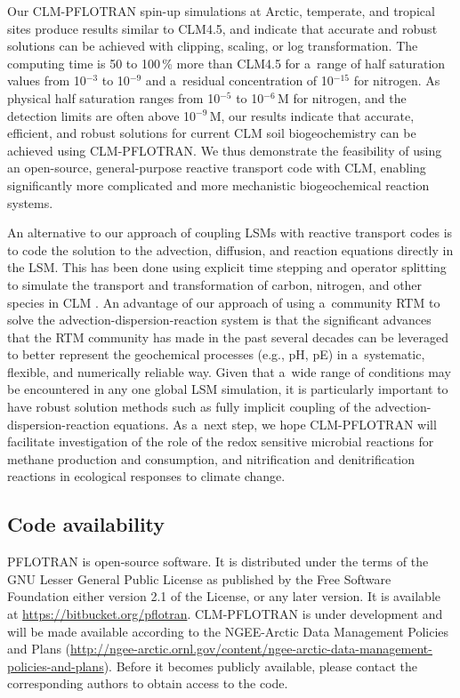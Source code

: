 \documentclass[gmdd, online, hvmath]{copernicus}
\begin{document}
      Our CLM-PFLOTRAN spin-up simulations at Arctic, temperate, and
      tropical sites produce results similar to CLM4.5, and indicate that
      accurate and robust solutions can be achieved with clipping, scaling, or
      log transformation. The computing time is 50 to 100\,{\%} more than
      CLM4.5 for a~range of half saturation values from 10$^{-3}$ to
      10$^{-9}$ and a~residual concentration of 10$^{-15}$ for nitrogen. As
      physical half saturation ranges from 10$^{-5}$ to 10$^{-6}$\,\unit{M}
      for nitrogen, and the detection limits are often above
      10$^{-9}$\,\unit{M}, our results indicate that accurate, efficient,
      and robust solutions for current CLM soil biogeochemistry can be
      achieved using CLM-PFLOTRAN.  We thus demonstrate the feasibility of
      using an open-source, general-purpose reactive transport code with
      CLM, enabling significantly more complicated and more mechanistic
      biogeochemical reaction systems.

      An alternative to our approach of coupling LSMs with reactive
      transport codes is to code the solution to the advection, diffusion,
      and reaction equations directly in the LSM. This has been done using
      explicit time stepping and operator splitting to simulate the
      transport and transformation of carbon, nitrogen, and other species in
      CLM \citep{Tang2013b}. An advantage of our approach of using
      a~community RTM to solve the advection-dispersion-reaction system is
      that the significant advances that the RTM community has made in the
      past several decades can be leveraged to better represent the
      geochemical processes (e.g., pH, pE) in a~systematic, flexible, and
      numerically reliable way. Given that a~wide range of conditions may be
      encountered in any one global LSM simulation, it is particularly
      important to have robust solution methods such as fully implicit
      coupling of the advection-dispersion-reaction equations.  As a~next
      step, we hope CLM-PFLOTRAN will facilitate investigation of the role
      of the redox sensitive microbial reactions for methane production and
      consumption, and nitrification and denitrification reactions in
      ecological responses to climate change.


\subsection*{Code availability}
PFLOTRAN is open-source
      software. It is distributed under the terms of the GNU Lesser General
      Public License as published by the Free Software Foundation either
      version 2.1 of the License, or any later version. It is available at
      \url{https://bitbucket.org/pflotran}. CLM-PFLOTRAN is under
      development and will be made available according to the NGEE-Arctic
      Data Management Policies and Plans
      (\url{http://ngee-arctic.ornl.gov/content/ngee-arctic-data-management-policies-and-plans}).
      Before it becomes publicly available, please contact the corresponding
      authors to obtain access to the code.
\end{document}
